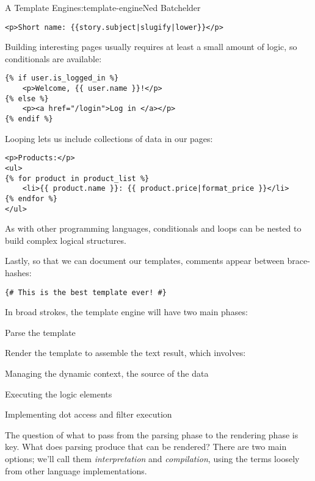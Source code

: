 \begin{aosachapter}{A Template Engine}{s:template-engine}{Ned Batchelder}
\begin{verbatim}
<p>Short name: {{story.subject|slugify|lower}}</p>
\end{verbatim}

Building interesting pages usually requires at least a small amount of
logic, so conditionals are available:

\begin{verbatim}
{% if user.is_logged_in %}
    <p>Welcome, {{ user.name }}!</p>
{% else %}
    <p><a href="/login">Log in </a></p>
{% endif %}
\end{verbatim}

Looping lets us include collections of data in our pages:

\begin{verbatim}
<p>Products:</p>
<ul>
{% for product in product_list %}
    <li>{{ product.name }}: {{ product.price|format_price }}</li>
{% endfor %}
</ul>
\end{verbatim}

As with other programming languages, conditionals and loops can be
nested to build complex logical structures.

Lastly, so that we can document our templates, comments appear between
brace-hashes:

\begin{verbatim}
{# This is the best template ever! #}
\end{verbatim}

\label{implementation-approaches}

In broad strokes, the template engine will have two main phases:

\begin{aosaitemize}

\item
  Parse the template
\item
  Render the template to assemble the text result, which involves:
\item
  Managing the dynamic context, the source of the data
\item
  Executing the logic elements
\item
  Implementing dot access and filter execution
\end{aosaitemize}

The question of what to pass from the parsing phase to the rendering
phase is key. What does parsing produce that can be rendered? There are
two main options; we'll call them \emph{interpretation} and
\emph{compilation}, using the terms loosely from other language
implementations.


\end{aosachapter}
